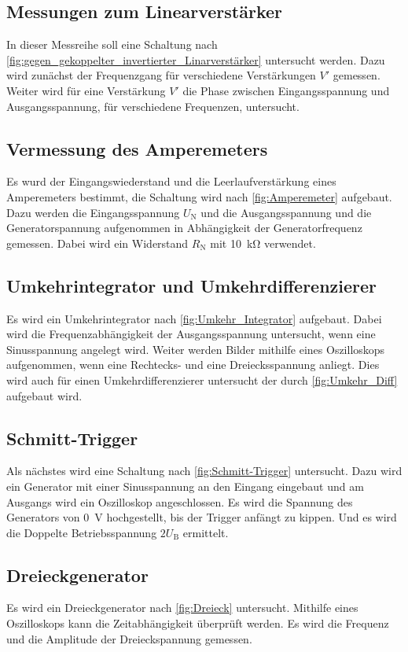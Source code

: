 \subsection{Messungen zum Linearverstärker}
In dieser Messreihe soll eine Schaltung nach \cref{fig:gegen_gekoppelter_invertierter_Linarverstärker} untersucht werden.
Dazu wird zunächst der Frequenzgang für verschiedene Verstärkungen $V'$ gemessen.
Weiter wird für eine Verstärkung $V'$ die Phase zwischen Eingangsspannung und Ausgangsspannung, für verschiedene Frequenzen, untersucht.
\subsection{Vermessung des Amperemeters}
Es wurd der Eingangswiederstand und die Leerlaufverstärkung eines Amperemeters bestimmt, die Schaltung wird nach \cref{fig:Amperemeter} aufgebaut.
Dazu werden die Eingangsspannung $U_\text{N}$ und die Ausgangsspannung und die Generatorspannung aufgenommen in Abhängigkeit der Generatorfrequenz gemessen.
Dabei wird ein Widerstand $R_\text{N}$ mit \SI{10}{\kilo\ohm} verwendet.
\subsection{Umkehrintegrator und Umkehrdifferenzierer}
Es wird ein Umkehrintegrator nach \cref{fig:Umkehr_Integrator} aufgebaut.
Dabei wird die Frequenzabhängigkeit der Ausgangsspannung untersucht, wenn eine Sinusspannung angelegt wird.
Weiter werden Bilder mithilfe eines Oszilloskops aufgenommen, wenn eine Rechtecks- und eine Dreiecksspannung anliegt.
Dies wird auch für einen Umkehrdifferenzierer untersucht der durch \cref{fig:Umkehr_Diff} aufgebaut wird.
\subsection{Schmitt-Trigger}
Als nächstes wird eine Schaltung nach \cref{fig:Schmitt-Trigger} untersucht.
Dazu wird ein Generator mit einer Sinusspannung an den Eingang eingebaut und am Ausgangs wird ein Oszilloskop angeschlossen.
Es wird die Spannung des Generators von \SI{0}{\volt} hochgestellt, bis der Trigger anfängt zu kippen.
Und es wird die Doppelte Betriebsspannung $2U_\text{B}$ ermittelt.
\subsection{Dreieckgenerator}
Es wird ein Dreieckgenerator nach \cref{fig:Dreieck} untersucht.
Mithilfe eines Oszilloskops kann die Zeitabhängigkeit überprüft werden.
Es wird die Frequenz und die Amplitude der Dreieckspannung gemessen.